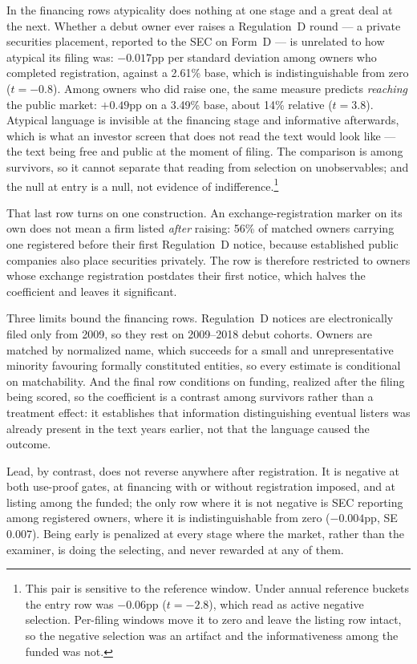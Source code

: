 \documentclass[11pt]{article}
\begin{document}
In the financing rows atypicality does nothing at one stage and a great deal
at the next. Whether a debut owner
ever raises a Regulation~D round --- a private securities placement,
reported to the SEC on Form~D --- is unrelated to how atypical its filing
was: $-0.017$pp per standard deviation among owners who completed
registration, against a 2.61\% base, which is indistinguishable from zero
($t = -0.8$). Among owners who did raise one, the same measure predicts
\emph{reaching} the public market: $+0.49$pp on a 3.49\% base, about 14\%
relative ($t = 3.8$). Atypical language is invisible at the financing stage
and informative afterwards, which is what an investor screen that does not
read the text would look like --- the text being free and public at the
moment of filing. The comparison is among survivors, so it cannot separate
that reading from selection on unobservables; and the null at entry is a
null, not evidence of indifference.\footnote{This pair is sensitive to the
reference window. Under annual reference buckets the entry row was
$-0.06$pp ($t = -2.8$), which read as active negative selection. Per-filing
windows move it to zero and leave the listing row intact, so the negative
selection was an artifact and the informativeness among the funded was
not.}

That last row turns on one construction. An exchange-registration marker on
its own does not mean a firm listed \emph{after} raising: 56\% of matched
owners carrying one registered before their first Regulation~D notice,
because established public companies also place securities privately. The
row is therefore restricted to owners whose exchange registration postdates
their first notice, which halves the coefficient and leaves it significant.

Three limits bound the financing rows. Regulation~D notices are
electronically filed only from 2009, so they rest on 2009--2018 debut
cohorts. Owners are matched by normalized name, which succeeds for a small
and unrepresentative minority favouring formally constituted entities, so
every estimate is conditional on matchability. And the final row conditions
on funding, realized after the filing being scored, so the coefficient is a
contrast among survivors rather than a treatment effect: it establishes that
information distinguishing eventual listers was already present in the text
years earlier, not that the language caused the outcome.

Lead, by contrast, does not reverse anywhere after registration. It is
negative at both use-proof gates, at financing with or without registration
imposed, and at listing among the funded; the only row where it is not negative is
SEC reporting among registered owners, where it is indistinguishable from
zero ($-0.004$pp, SE $0.007$). Being early is penalized at every stage where the
market, rather than the examiner, is doing the selecting, and never rewarded
at any of them.
\end{document}
